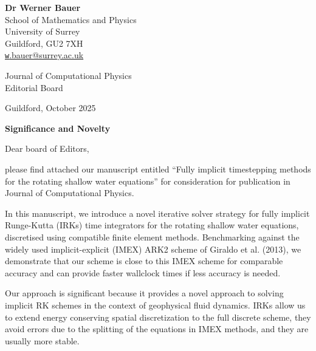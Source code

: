 \documentclass[a4paper,12pt]{article}
\begin{document}
\begin{flushright}
\textbf{Dr Werner Bauer}\\
School of Mathematics and Physics\\
University of Surrey\\
Guildford, GU2 7XH\\
\href{mailto:w.bauer@surrey.ac.uk}{\texttt w.bauer@surrey.ac.uk}\
\end{flushright}


\vspace{-0.5em}

\begin{flushleft}
Journal of Computational Physics\\
Editorial Board
\end{flushleft}

\vspace{-0.5em}

\begin{flushright}
Guildford, October 2025
\end{flushright}

\vspace{1.5em}



{\bf Significance and Novelty}


\vspace{1.5em}
Dear board of Editors,


\vspace{0.8em}

please find attached our manuscript entitled ``Fully implicit timestepping methods for the rotating shallow water equations'' for consideration for publication in Journal of Computational Physics.

\vspace{0.8em}

In this manuscript, we introduce a novel iterative solver strategy for
fully implicit Runge-Kutta (IRKs) time integrators for the rotating
shallow water equations, discretised using compatible finite element
methods. Benchmarking against the widely used implicit-explicit (IMEX)
ARK2 scheme of Giraldo et al. (2013), we demonstrate that our scheme
is close to this IMEX scheme for comparable accuracy and can provide
faster wallclock times if less accuracy is needed.

\vspace{0.8em}

Our approach is significant because it provides a novel approach to
solving implicit RK schemes in the context of geophysical fluid dynamics.
IRKs allow us to extend energy conserving spatial discretization to the full
discrete scheme, they avoid errors due to the splitting of the equations in IMEX methods, and they are usually more stable.
\end{document}
